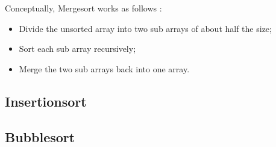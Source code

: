 Conceptually, Mergesort works as follows \cite{Abhyankar2011}:
\begin{itemize}
    \item Divide the unsorted array into two sub arrays of about half the size;
    \item Sort each sub array recursively;
    \item Merge the two sub arrays back into one array.
\end{itemize}

\subsection{Insertionsort}

\subsection{Bubblesort}